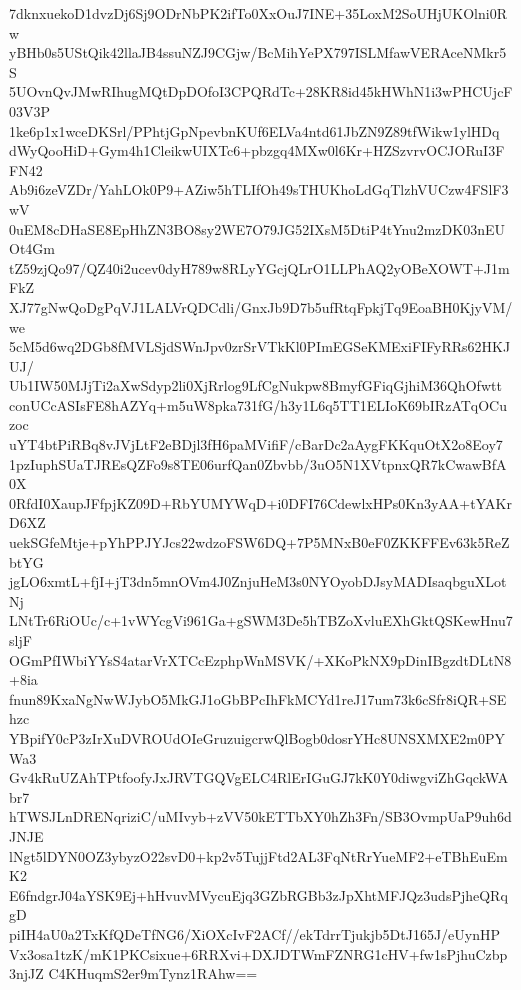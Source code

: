 7dknxuekoD1dvzDj6Sj9ODrNbPK2ifTo0XxOuJ7INE+35LoxM2SoUHjUKOlni0Rw
yBHb0s5UStQik42llaJB4ssuNZJ9CGjw/BcMihYePX797ISLMfawVERAceNMkr5S
5UOvnQvJMwRIhugMQtDpDOfoI3CPQRdTc+28KR8id45kHWhN1i3wPHCUjcF03V3P
1ke6p1x1wceDKSrl/PPhtjGpNpevbnKUf6ELVa4ntd61JbZN9Z89tfWikw1ylHDq
dWyQooHiD+Gym4h1CleikwUIXTc6+pbzgq4MXw0l6Kr+HZSzvrvOCJORuI3FFN42
Ab9i6zeVZDr/YahLOk0P9+AZiw5hTLIfOh49sTHUKhoLdGqTlzhVUCzw4FSlF3wV
0uEM8cDHaSE8EpHhZN3BO8sy2WE7O79JG52IXsM5DtiP4tYnu2mzDK03nEUOt4Gm
tZ59zjQo97/QZ40i2ucev0dyH789w8RLyYGcjQLrO1LLPhAQ2yOBeXOWT+J1mFkZ
XJ77gNwQoDgPqVJ1LALVrQDCdli/GnxJb9D7b5ufRtqFpkjTq9EoaBH0KjyVM/we
5cM5d6wq2DGb8fMVLSjdSWnJpv0zrSrVTkKl0PImEGSeKMExiFIFyRRs62HKJUJ/
Ub1IW50MJjTi2aXwSdyp2li0XjRrlog9LfCgNukpw8BmyfGFiqGjhiM36QhOfwtt
conUCcASIsFE8hAZYq+m5uW8pka731fG/h3y1L6q5TT1ELIoK69bIRzATqOCuzoc
uYT4btPiRBq8vJVjLtF2eBDjl3fH6paMVifiF/cBarDc2aAygFKKquOtX2o8Eoy7
1pzIuphSUaTJREsQZFo9s8TE06urfQan0Zbvbb/3uO5N1XVtpnxQR7kCwawBfA0X
0RfdI0XaupJFfpjKZ09D+RbYUMYWqD+i0DFI76CdewlxHPs0Kn3yAA+tYAKrD6XZ
uekSGfeMtje+pYhPPJYJcs22wdzoFSW6DQ+7P5MNxB0eF0ZKKFFEv63k5ReZbtYG
jgLO6xmtL+fjI+jT3dn5mnOVm4J0ZnjuHeM3s0NYOyobDJsyMADIsaqbguXLotNj
LNtTr6RiOUc/c+1vWYcgVi961Ga+gSWM3De5hTBZoXvluEXhGktQSKewHnu7sljF
OGmPfIWbiYYsS4atarVrXTCcEzphpWnMSVK/+XKoPkNX9pDinIBgzdtDLtN8+8ia
fnun89KxaNgNwWJybO5MkGJ1oGbBPcIhFkMCYd1reJ17um73k6cSfr8iQR+SEhzc
YBpifY0cP3zIrXuDVROUdOIeGruzuigcrwQlBogb0dosrYHc8UNSXMXE2m0PYWa3
Gv4kRuUZAhTPtfoofyJxJRVTGQVgELC4RlErIGuGJ7kK0Y0diwgviZhGqckWAbr7
hTWSJLnDRENqriziC/uMIvyb+zVV50kETTbXY0hZh3Fn/SB3OvmpUaP9uh6dJNJE
lNgt5lDYN0OZ3ybyzO22svD0+kp2v5TujjFtd2AL3FqNtRrYueMF2+eTBhEuEmK2
E6fndgrJ04aYSK9Ej+hHvuvMVycuEjq3GZbRGBb3zJpXhtMFJQz3udsPjheQRqgD
piIH4aU0a2TxKfQDeTfNG6/XiOXcIvF2ACf//ekTdrrTjukjb5DtJ165J/eUynHP
Vx3osa1tzK/mK1PKCsixue+6RRXvi+DXJDTWmFZNRG1cHV+fw1sPjhuCzbp3njJZ
C4KHuqmS2er9mTynz1RAhw==
